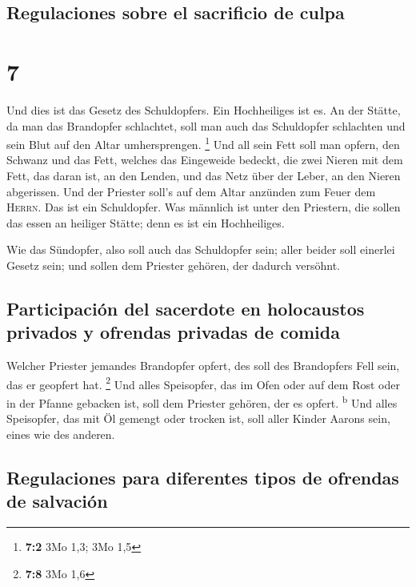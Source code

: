 \hypertarget{regulaciones-sobre-el-sacrificio-de-culpa}{%
\subsection{Regulaciones sobre el sacrificio de
culpa}\label{regulaciones-sobre-el-sacrificio-de-culpa}}

\hypertarget{section-6}{%
\section{7}\label{section-6}}

 Und dies ist das Gesetz des Schuldopfers. Ein
Hochheiliges ist es.  An der Stätte, da man das Brandopfer
schlachtet, soll man auch das Schuldopfer schlachten und sein Blut auf
den Altar umhersprengen. \footnote{\textbf{7:2} 3Mo 1,3; 3Mo 1,5}
 Und all sein Fett soll man opfern, den Schwanz und das
Fett, welches das Eingeweide bedeckt,  die zwei Nieren mit
dem Fett, das daran ist, an den Lenden, und das Netz über der Leber, an
den Nieren abgerissen.  Und der Priester soll's auf dem
Altar anzünden zum Feuer dem \textsc{Herrn}. Das ist ein Schuldopfer.
 Was männlich ist unter den Priestern, die sollen das
essen an heiliger Stätte; denn es ist ein Hochheiliges.

 Wie das Sündopfer, also soll auch das Schuldopfer sein;
aller beider soll einerlei Gesetz sein; und sollen dem Priester gehören,
der dadurch versöhnt.

\hypertarget{participaciuxf3n-del-sacerdote-en-holocaustos-privados-y-ofrendas-privadas-de-comida}{%
\subsection{Participación del sacerdote en holocaustos privados y
ofrendas privadas de
comida}\label{participaciuxf3n-del-sacerdote-en-holocaustos-privados-y-ofrendas-privadas-de-comida}}

 Welcher Priester jemandes Brandopfer opfert, des soll des
Brandopfers Fell sein, das er geopfert hat. \footnote{\textbf{7:8} 3Mo
  1,6}  Und alles Speisopfer, das im Ofen oder auf dem
Rost oder in der Pfanne gebacken ist, soll dem Priester gehören, der es
opfert. \textsuperscript{b}  Und alles Speisopfer, das
mit Öl gemengt oder trocken ist, soll aller Kinder Aarons sein, eines
wie des anderen.

\hypertarget{regulaciones-para-diferentes-tipos-de-ofrendas-de-salvaciuxf3n}{%
\subsection{Regulaciones para diferentes tipos de ofrendas de
salvación}\label{regulaciones-para-diferentes-tipos-de-ofrendas-de-salvaciuxf3n}}

